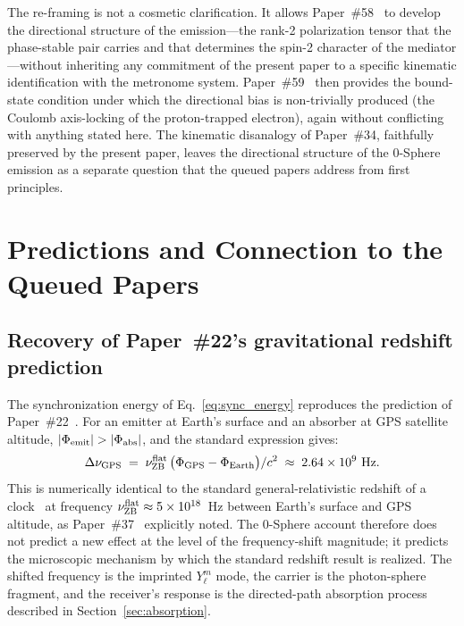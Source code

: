 \documentclass[%
 reprint, amsmath,amssymb, aps, prb, ]{revtex4-2}
\numberwithin{equation}{section}
\newcommand{\nuZBf}{\nu_{\text{ZB}}^{\rm flat}}
\begin{document}
The re-framing is not a cosmetic clarification. It allows Paper~\#58~\cite{hanamura58} to develop the directional structure of the emission---the rank-2 polarization tensor that the phase-stable pair carries and that determines the spin-2 character of the mediator---without inheriting any commitment of the present paper to a specific kinematic identification with the metronome system. Paper~\#59~\cite{hanamura59} then provides the bound-state condition under which the directional bias is non-trivially produced (the Coulomb axis-locking of the proton-trapped electron), again without conflicting with anything stated here. The kinematic disanalogy of Paper~\#34, faithfully preserved by the present paper, leaves the directional structure of the 0-Sphere emission as a separate question that the queued papers address from first principles.

\section{Predictions and Connection to the Queued Papers}
\label{sec:predictions}

\subsection{Recovery of Paper~\#22's gravitational redshift prediction}

The synchronization energy of Eq.~\eqref{eq:sync_energy} reproduces the prediction of Paper~\#22~\cite{hanamura22}. For an emitter at Earth's surface and an absorber at GPS satellite altitude, $|\Phi_{\rm emit}| > |\Phi_{\rm abs}|$, and the standard expression gives:
\begin{equation}
\Delta\nu_{\rm GPS}\;=\;\nuZBf\,\bigl(\Phi_{\rm GPS} - \Phi_{\rm Earth}\bigr)/c^2 \;\approx\; 2.64\times 10^9\ \text{Hz}.
\label{eq:gps}
\end{equation}
This is numerically identical to the standard general-relativistic redshift of a clock~\cite{pound_rebka1960,vessot1980} at frequency $\nuZBf \approx 5\times 10^{18}$~Hz between Earth's surface and GPS altitude, as Paper~\#37~\cite{hanamura37} explicitly noted. The 0-Sphere account therefore does not predict a new effect at the level of the frequency-shift magnitude; it predicts the microscopic mechanism by which the standard redshift result is realized. The shifted frequency is the imprinted $Y_\ell^m$ mode, the carrier is the photon-sphere fragment, and the receiver's response is the directed-path absorption process described in Section~\ref{sec:absorption}.
\end{document}
